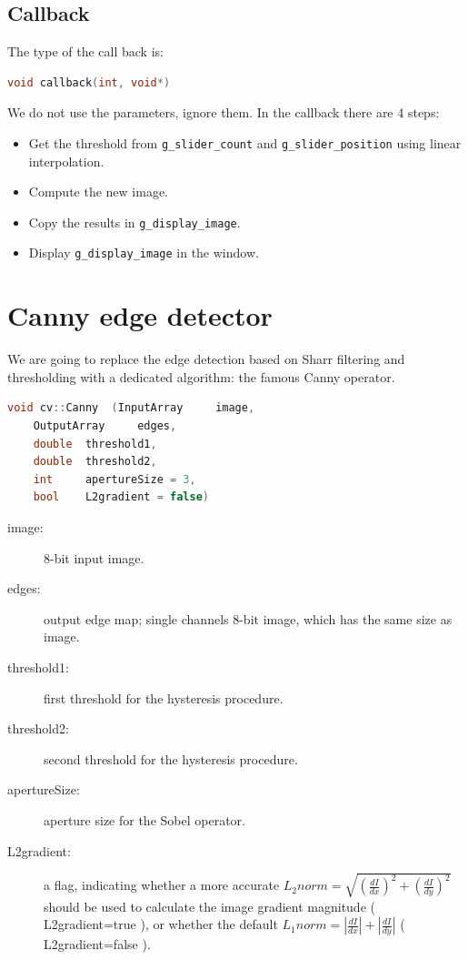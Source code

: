 \documentclass[english,a4paper,12pt,oneside]{article}
\begin{document}
 \subsection{Callback}
 
The type of the call back is:
\begin{lstlisting}[language=c++]
void callback(int, void*)
\end{lstlisting}
We do not use the parameters, ignore them.
In the callback there are 4 steps:
\begin{itemize}
 \item Get the threshold from \verb+g_slider_count+ and \verb+g_slider_position+ using linear interpolation.
 \item Compute the new image.
 \item Copy the results in \verb+g_display_image+.
 \item Display \verb+g_display_image+ in the window.
\end{itemize}


\section{Canny edge detector}

We are going to replace the edge detection based on Sharr filtering and thresholding with a dedicated algorithm: the famous Canny operator. 
\begin{lstlisting}[language=c++]
void cv::Canny	(InputArray 	image,
	OutputArray 	edges,
	double 	threshold1,
	double 	threshold2,
	int 	apertureSize = 3,
	bool 	L2gradient = false)		
\end{lstlisting}
\begin{description}
\item[image:] 	8-bit input image.
\item[edges:]	output edge map; single channels 8-bit image, which has the same size as image.
\item[threshold1:]	first threshold for the hysteresis procedure.
\item[threshold2:]	second threshold for the hysteresis procedure.
\item[apertureSize:]	aperture size for the Sobel operator.
\item[L2gradient:]	a flag, indicating whether a more accurate $L_2 norm = \sqrt{\left(\frac{dI}{dx}\right)^2+\left(\frac{dI}{dy}\right)^2}$ should be used to calculate the image gradient magnitude ( L2gradient=true ), or whether the default $L_1 norm = \left|\frac{dI}{dx}\right|+\left|\frac{dI}{dy}\right|$ ( L2gradient=false ).
\end{description}
\end{document}
